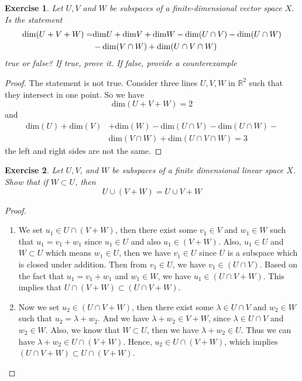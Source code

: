 \documentclass[11pt]{book}
\newtheorem{exercise}{Exercise}[section]
\theoremstyle{definition}
\numberwithin{equation}{subsection}
\begin{document}
\begin{exercise}\label{ex_2}
Let $U, V$ and $W$ be subspaces of a finite-dimensional vector space $X$. Is the statement
\begin{align*}
    {\rm dim}(U + V + W) = & {\rm dim} U + {\rm dim} V + {\rm dim} W - {\rm dim}(U \cap V) - {\rm dim}(U \cap W) \\
    & - {\rm dim}(V \cap W) + {\rm dim}(U \cap V \cap W)
\end{align*}
true or false? If true, prove it. If false, provide a counterexample
\end{exercise}
\begin{proof}
The statement is not true. Consider three lines $U,V,W$ in $\mathbb{R}^2$ such that they intersect in one point. So we have
$$\text{dim} (U+V+W) = 2$$
and
\begin{align*}
   \text{dim}(U) + \text{dim}(V) & + \text{dim}(W) - \text{dim}(U \cap V) - \text{dim}(U \cap W) - \\
   & \text{dim}(V \cap W) + \text{dim}(U \cap V \cap W) = 3
\end{align*}
the left and right sides are not the same. 
\end{proof}

\medskip

\begin{exercise}\label{ex_3}
Let $U, V$, and $W$ be subspaces of a finite dimensional linear space $X$. Show that if $W\subset U$, then 
$$U\cup (V + W) = U\cup V + W$$
\end{exercise}
\begin{proof}
~\begin{enumerate}[label=(\arabic*)]
    \item We set $u_1 \in U \cap (V+W)$, then there exist some $v_1 \in V$ and $w_1 \in W$ such that $u_1 = v_1 + w_1$ since $u_1 \in U$ and also $u_1 \in (V+W)$. Also, $u_1 \in U$ and $W \subset U$ which means $w_1 \in U$, then we have $v_1 \in U$ since $U$ is a subspace which is closed under addition. Then from $v_1 \in U$, we have $v_1 \in (U \cap V)$. Based on the fact that $u_1 = v_1 + w_1$ and $w_1 \in W$, we have $u_1 \in (U \cap V + W)$. This implies that $U \cap (V+W) \subset (U \cap V + W)$.
    \item Now we set $u_2 \in (U \cap V + W)$, then there exist some $\lambda \in U \cap V$ and $w_2 \in W$ such that $u_2 = \lambda + w_2$. And we have $\lambda + w_2 \in V+W$, since $\lambda \in U \cap V$ and $w_2 \in W$. Also, we know that $W \subset U$, then we have $\lambda + w_2 \in U$. Thus we can have $\lambda + w_2 \in U \cap (V+W)$. Hence, $u_2 \in U \cap (V+W)$, which implies $(U \cap V + W) \subset U \cap (V+W)$.
\end{enumerate}
\end{proof}
\end{document}
